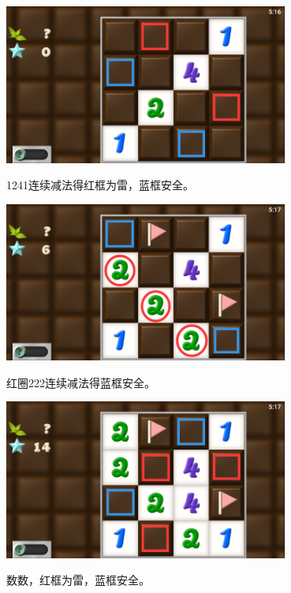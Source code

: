 \subsection{} %
\begin{center}
    \includegraphics[width=0.7\textwidth]{puzzle/79-1.png}
\end{center}
1241连续减法得红框为雷，蓝框安全。
\begin{center}
    \includegraphics[width=0.7\textwidth]{puzzle/79-2.png}
\end{center}
红圈222连续减法得蓝框安全。
\begin{center}
    \includegraphics[width=0.7\textwidth]{puzzle/79-3.png}
\end{center}
数数，红框为雷，蓝框安全。

